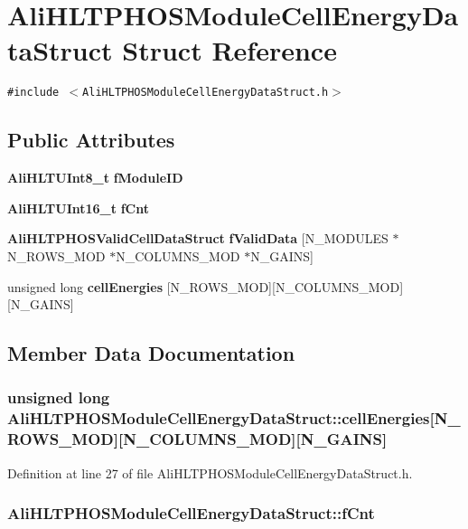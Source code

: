 \section{Ali\-HLTPHOSModule\-Cell\-Energy\-Data\-Struct Struct Reference}
\label{structAliHLTPHOSModuleCellEnergyDataStruct}
{\tt \#include $<$Ali\-HLTPHOSModule\-Cell\-Energy\-Data\-Struct.h$>$}

\subsection*{Public Attributes}
\begin{CompactItemize}
\item 
{\bf Ali\-HLTUInt8\_\-t} {\bf f\-Module\-ID}
\item 
{\bf Ali\-HLTUInt16\_\-t} {\bf f\-Cnt}
\item 
{\bf Ali\-HLTPHOSValid\-Cell\-Data\-Struct} {\bf f\-Valid\-Data} [N\_\-MODULES $\ast$N\_\-ROWS\_\-MOD $\ast$N\_\-COLUMNS\_\-MOD $\ast$N\_\-GAINS]
\item 
unsigned long {\bf cell\-Energies} [N\_\-ROWS\_\-MOD][N\_\-COLUMNS\_\-MOD][N\_\-GAINS]
\end{CompactItemize}


\subsection{Member Data Documentation}
\subsubsection{\setlength{\rightskip}{0pt plus 5cm}unsigned long {\bf Ali\-HLTPHOSModule\-Cell\-Energy\-Data\-Struct::cell\-Energies}[N\_\-ROWS\_\-MOD][N\_\-COLUMNS\_\-MOD][N\_\-GAINS]}\label{structAliHLTPHOSModuleCellEnergyDataStruct_o3}




Definition at line 27 of file Ali\-HLTPHOSModule\-Cell\-Energy\-Data\-Struct.h.
\subsubsection{ {\bf Ali\-HLTPHOSModule\-Cell\-Energy\-Data\-Struct::f\-Cnt}}\label{structAliHLTPHOSModuleCellEnergyDataStruct_o1}





